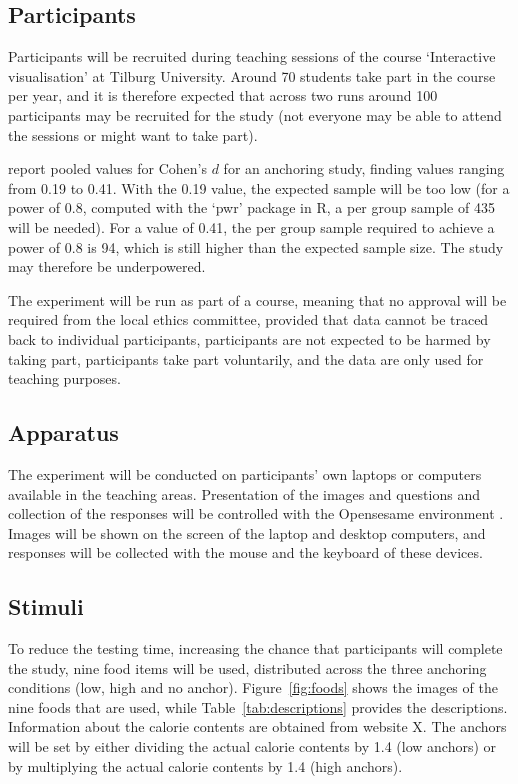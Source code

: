 \documentclass[a4paper,doc,natbib]{apa6}
\begin{document}
    \subsection{Participants}

    Participants will be recruited during teaching sessions of the course `Interactive visualisation' at Tilburg University. Around 70 students take part in the course per year, and it is therefore expected that across two runs around 100 participants may be recruited for the study (not everyone may be able to attend the sessions or might want to take part).

    \citet{shanks2020incidental} report pooled values for Cohen's $d$ for an anchoring study, finding values ranging from 0.19 to 0.41. With the 0.19 value, the expected sample will be too low (for a power of 0.8, computed with the `pwr' package in R, a per group sample of 435 will be needed). For a value of 0.41, the per group sample required to achieve a power of 0.8 is 94, which is still higher than the expected sample size. The study may therefore be underpowered.

    The experiment will be run as part of a course, meaning that no approval will be required from the local ethics committee, provided that data cannot be traced back to individual participants, participants are not expected to be harmed by taking part, participants take part voluntarily, and the data are only used for teaching purposes.

    \subsection{Apparatus}

    The experiment will be conducted on participants' own laptops or computers available in the teaching areas. Presentation of the images and questions and collection of the responses will be controlled with the Opensesame environment \citep{mathot2012opensesame}. Images will be shown on the screen of the laptop and desktop computers, and responses will be collected with the mouse and the keyboard of these devices.

    \subsection{Stimuli}

    To reduce the testing time, increasing the chance that participants will complete the study, nine food items will be used, distributed across the three anchoring conditions (low, high and no anchor). Figure~\ref{fig:foods} shows the images of the nine foods that are used, while Table~\ref{tab:descriptions} provides the descriptions. Information about the calorie contents are obtained from website X. The anchors will be set by either dividing the actual calorie contents by 1.4 (low anchors) or by multiplying the actual calorie contents by 1.4 (high anchors).
\end{document}

